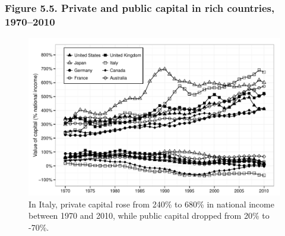 \documentclass[t]{beamer}\usepackage[]{graphicx}\usepackage[]{color}
\newenvironment{knitrout}{}{} %
\begin{document}
\begin{frame}[label=Figure_5_5]
\frametitle{Figure 5.5. Private and public capital in rich countries, 1970--2010}
\begin{figure}[t]
\begin{minipage}[b]{\textwidth}
\centering
\begin{knitrout}\footnotesize
{}\color{fgcolor}

{\centering \includegraphics[width=1\linewidth]{figures/bw/Figure_5_5} 

}



\end{knitrout}
\caption{In Italy, private capital rose from 240\% to 680\% in national income between 1970 and 2010, while public capital dropped from 20\% to -70\%.}
\end{minipage}
\end{figure}
\end{frame}
\end{document}
